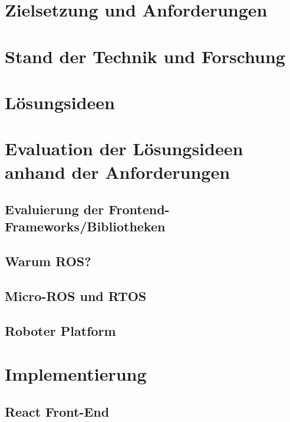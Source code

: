\documentclass[11pt,twoside,a4paper,titlepage]{article}
\begin{document}
\section{Zielsetzung und Anforderungen}


\section{Stand der Technik und Forschung}


\section{Lösungsideen}


\section{Evaluation der Lösungsideen anhand der Anforderungen}

\subsection{Evaluierung der Frontend-Frameworks/Bibliotheken}


\subsection{Warum ROS?}


\subsection{Micro-ROS und RTOS}


\subsection{Roboter Platform}


\section{Implementierung}

\subsection{React Front-End}
\end{document}
